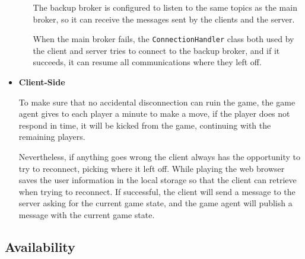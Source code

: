\documentclass{scrartcl}
\begin{document}
\begin{itemize}
\begin{itemize}
                        The backup broker is configured to listen to the same topics as the 
                        main broker, so it can receive the messages sent by the clients and the server.
                         
                        When the main broker fails, the \texttt{ConnectionHandler} class both used 
                        by the client and server tries to connect to the backup broker, 
                        and if it succeeds, it can resume all communications where they left off.
            \end{itemize}
      \item
            \textbf{Client-Side} \par
            To make sure that no accidental disconnection can ruin the game, the game agent gives to
            each player a minute to make a move, if the player does not respond in time, it will be 
            kicked from the game, continuing with the remaining players.

            Nevertheless, if anything goes wrong the client always has the opportunity to try to 
            reconnect, picking where it left off. While playing the web browser saves the user 
            information in the local storage so that the client can retrieve when trying to reconnect.
            If successful, the client will send a message to the server asking for the current game 
            state, and the game agent will publish a message with the current game state.
\end{itemize}

\subsection{Availability}\label{availability}


\end{document}
